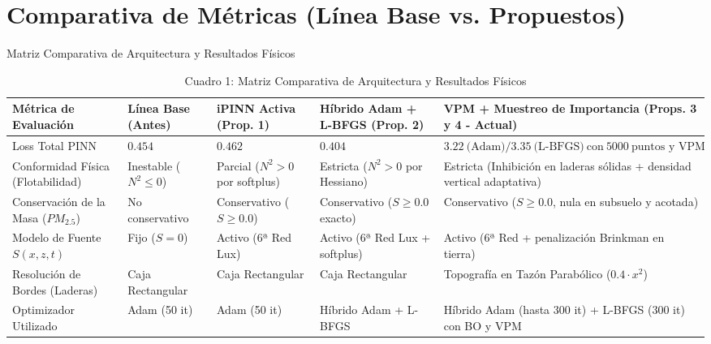 \documentclass[11pt,a4paper]{article}
\begin{document}
\section*{Comparativa de Métricas (Línea Base vs. Propuestos)}
\begin{table}[htbp]
\centering
\caption{Matriz Comparativa de Arquitectura y Resultados Físicos}
\footnotesize %
\setlength{\tabcolsep}{3pt} %

\begin{tabularx}{\textwidth}{
    >{\raggedright\arraybackslash}p{2.8cm}
    >{\raggedright\arraybackslash}p{2.2cm}
    >{\raggedright\arraybackslash}p{2.5cm}
    >{\raggedright\arraybackslash}p{3cm}
    >{\raggedright\arraybackslash}X %
}
\toprule
\textbf{Métrica de Evaluación} & \textbf{Línea Base (Antes)} & \textbf{iPINN Activa (Prop. 1)} & \textbf{Híbrido Adam + L-BFGS (Prop. 2)} & \textbf{VPM + Muestreo de Importancia (Props. 3 y 4 - Actual)} \\
\midrule
Loss Total PINN & $0.454$ & $0.462$ & $0.404$ & $3.22\ \text{(Adam)} / 3.35\ \text{(L-BFGS)}\ \text{con}\ 5000\ \text{puntos y VPM}$ \\ \addlinespace
Conformidad Física (Flotabilidad) & Inestable ($N^2 \le 0$) & Parcial ($N^2 > 0$ por softplus) & Estricta ($N^2 > 0$ por Hessiano) & Estricta (Inhibición en laderas sólidas + densidad vertical adaptativa) \\ \addlinespace
Conservación de la Masa ($PM_{2.5}$) & No conservativo & Conservativo ($S \ge 0.0$) & Conservativo ($S \ge 0.0$ exacto) & Conservativo ($S \ge 0.0$, nula en subsuelo y acotada) \\ \addlinespace
Modelo de Fuente $S(x, z, t)$ & Fijo ($S = 0$) & Activo (6ª Red Lux) & Activo (6ª Red Lux + softplus) & Activo (6ª Red + penalización Brinkman en tierra) \\ \addlinespace
Resolución de Bordes (Laderas) & Caja Rectangular & Caja Rectangular & Caja Rectangular & Topografía en Tazón Parabólico ($0.4 \cdot x^2$) \\ \addlinespace
Optimizador Utilizado & Adam (50 it) & Adam (50 it) & Híbrido Adam + L-BFGS & Híbrido Adam (hasta 300 it) + L-BFGS (300 it) con BO y VPM \\
\bottomrule
\end{tabularx}
\caption{Cuadro 1: Matriz Comparativa de Arquitectura y Resultados Físicos}
\end{table}
\end{document}
